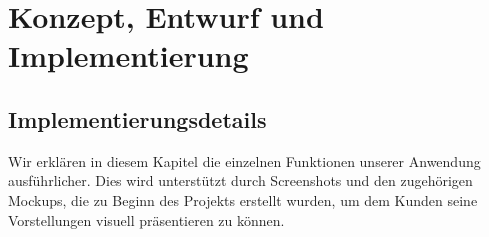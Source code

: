 \chapter{Konzept, Entwurf und Implementierung}
\label{cha:implementierung}

\section{Implementierungsdetails}
\label{sec:implementierung:implementierungsdetails}

Wir erklären in diesem Kapitel die einzelnen Funktionen unserer Anwendung ausführlicher. Dies wird unterstützt durch Screenshots und den zugehörigen Mockups, die zu Beginn des Projekts erstellt wurden, um dem Kunden seine Vorstellungen visuell präsentieren zu können.\\


